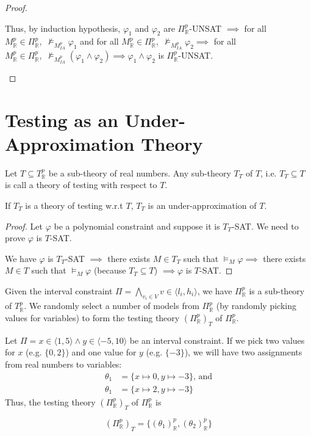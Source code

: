\begin{proof}
\begin{enumerate}
Thus, by induction hypothesis, $\varphi_1$ and $\varphi_2$ are $\Pi^p_\mathbb{R}$-UNSAT $\implies$ for all $M^p_\mathbb{R} \in \Pi^p_\mathbb{R}, \; \not\models_{M^p_{IA}} \varphi_1$ and for all $M^p_\mathbb{R} \in \Pi^p_\mathbb{R}, \; \not\models_{M^p_{IA}} \varphi_2 \implies$ for all $M^p_\mathbb{R} \in \Pi^p_\mathbb{R}, \; \not\models_{M^p_{IA}} (\varphi_1 \wedge \varphi_2) \implies \varphi_1 \wedge \varphi_2$ is $\Pi^p_\mathbb{R}$-UNSAT.
\end{enumerate}
\end{proof}

\section{Testing as an Under-Approximation Theory}
\begin{definition}
Let $T \subseteq T^p_\mathbb{R}$ be a sub-theory of real numbers. Any sub-theory $T_T$ of $T$, i.e. $T_T \subseteq T$ is call a theory of testing with respect to $T$.
\end{definition}

\begin{theorem}
If $T_T$ is a theory of testing w.r.t $T$, $T_T$ is an under-approximation of $T$.
\end{theorem}

\begin{proof}
Let $\varphi$ be a polynomial constraint and suppose it is $T_T$-SAT. We need to prove $\varphi$ is $T$-SAT. 

We have $\varphi$ is $T_T$-SAT $\implies $ there exists $M \in T_T$ such that $\models_{M} \varphi \implies $ there exists $M \in T$ such that $\models_{M} \varphi$ {(because $T_T \subseteq T$)} $\implies \varphi$ is $T$-SAT.
\end{proof}

Given the interval constraint $\Pi = \bigwedge\limits_{v_i \in V} v \in \langle l_i, h_i \rangle$, we have $\Pi^p_\mathbb{R}$ is a sub-theory of $T^p_\mathbb{R}$. We randomly select a number of models from $\Pi^p_\mathbb{R}$ (by randomly picking values for variables) to form the testing theory $(\Pi^p_\mathbb{R})_T$ of $\Pi^p_\mathbb{R}$.

\begin{example}
Let $\Pi = x \in \langle 1, 5 \rangle \wedge y \in \langle -5, 10 \rangle$ be an interval constraint. If we pick two values for $x$ (e.g. $\{0, 2\}$) and one value for $y$ (e.g. $\{-3\}$), we will have two assignments from real numbers to variables:
\begin{align*}
\theta_1 &= \{x \mapsto 0, y \mapsto -3\} \text{, and} \\
\theta_1 &= \{x \mapsto 2, y \mapsto -3\}
\end{align*}
Thus, the testing theory $(\Pi^p_\mathbb{R})_T$ of $\Pi^p_\mathbb{R}$ is

\[(\Pi^p_\mathbb{R})_T = \{(\theta_1)^p_\mathbb{R}, (\theta_2)^p_\mathbb{R}\}\]
\end{example}

